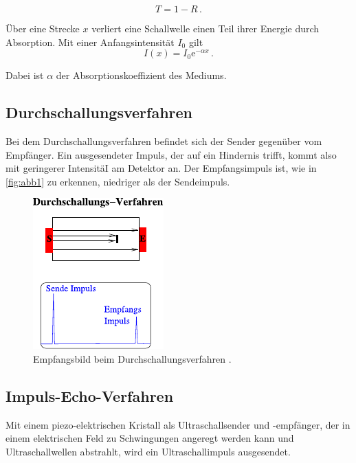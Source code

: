 \begin{equation}
    T = 1 - R\, .  %
    \label{eq:transmisskoeff}
\end{equation}


Über eine Strecke $x$ verliert eine Schallwelle einen Teil ihrer
Energie durch Absorption. Mit einer Anfangsintensität $I_0$ gilt %
\begin{equation}
    I(x) = I_0 \mathrm{e}^{-\alpha x} \,.
\end{equation}

Dabei ist $\alpha$ der Absorptionskoeffizient des Mediums.

\subsection{Durchschallungsverfahren}

Bei dem Durchschallungsverfahren befindet sich der Sender gegenüber
vom Empfänger.
Ein ausgesendeter Impuls, der auf ein Hindernis trifft, kommt
also mit geringerer IntensitäI am Detektor an.          %
Der Empfangsimpuls ist, wie in \autoref{fig:abb1} zu erkennen,%
niedriger als der Sendeimpuls.

\begin{figure}
    \centering
    \includegraphics{figures/abb1.pdf}
    \caption{Empfangsbild beim Durchschallungsverfahren \cite{ap06}.}
    \label{fig:abb1}
\end{figure}

\subsection{Impuls-Echo-Verfahren}

Mit einem piezo-elektrischen Kristall als Ultraschallsender und
-empfänger, der in einem elektrischen Feld zu Schwingungen
angeregt werden kann und Ultraschallwellen abstrahlt, wird ein
Ultraschallimpuls ausgesendet. \\

